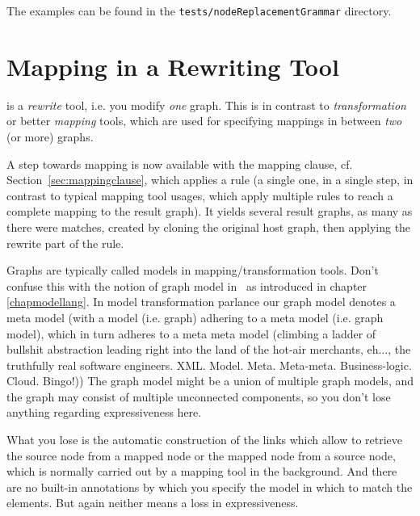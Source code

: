 The examples can be found in the \texttt{tests/nodeReplacementGrammar} directory.


\section{Mapping in a Rewriting Tool}\label{sec:transfo}

\GrG{} is a \emph{rewrite} tool, i.e. you modify \emph{one} graph.
This is in contrast to \emph{transformation} or better \emph{mapping} tools, which are used for specifying mappings in between \emph{two} (or more) graphs.

A step towards mapping is now available with the mapping clause, cf. Section~\ref{sec:mappingclause}, which applies a rule (a single one, in a single step, in contrast to typical mapping tool usages, which apply multiple rules to reach a complete mapping to the result graph).
It yields several result graphs, as many as there were matches, created by cloning the original host graph, then applying the rewrite part of the rule.

Graphs are typically called models in mapping/transformation tools. Don't confuse this with the notion of graph model in \GrG\ as introduced in chapter \ref{chapmodellang}. In model transformation parlance our graph model denotes a meta model (with a model (i.e. graph) adhering to a meta model (i.e. graph model), which in turn adheres to a meta meta model (climbing a ladder of bullshit abstraction leading right into the land of the hot-air merchants, eh..., the truthfully real software engineers. XML. Model. Meta. Meta-meta. Business-logic. Cloud. Bingo!))
The graph model might be a union of multiple graph models, and the graph may consist of multiple unconnected components, so you don't lose anything regarding expressiveness here.

What you lose is the automatic construction of the  links which allow to retrieve the source node from a mapped node or the mapped node from a source node, which is normally carried out by a mapping tool in the background.
And there are no built-in annotations by which you specify the model in which to match the elements.
But again neither means a loss in expressiveness.

